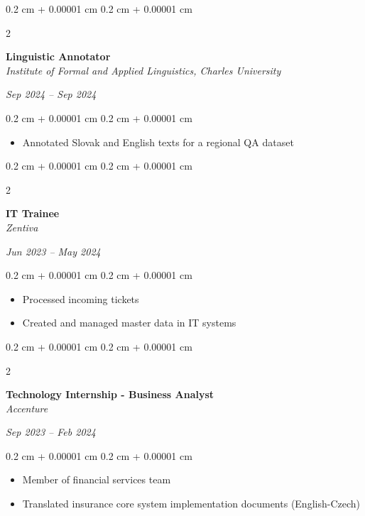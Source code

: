 \documentclass[10pt, letterpaper]{article}
\newenvironment{highlights}{
    \begin{itemize}[
        topsep=0.10 cm,
        parsep=0.10 cm,
        partopsep=0pt,
        itemsep=0pt,
        leftmargin=0.4 cm + 10pt
    ]
}{
    \end{itemize}
} %
\newenvironment{onecolentry}{
    \begin{adjustwidth}{
        0.2 cm + 0.00001 cm
    }{
        0.2 cm + 0.00001 cm
    }
}{
    \end{adjustwidth}
} %
\newenvironment{twocolentry}[2][]{
    \onecolentry
    \def\secondColumn{#2}
    \setcolumnwidth{\fill, 4.5 cm}
    \begin{paracol}{2}
}{
    \switchcolumn \raggedleft \secondColumn
    \end{paracol}
    \endonecolentry
} %
\begin{document}
        \vspace{0.2 cm}
        \begin{twocolentry}{\textit{Sep 2024 – Sep 2024}}
            \textbf{Linguistic Annotator}  \\
            \textit{Institute of Formal and Applied Linguistics, Charles University}
        \end{twocolentry}
        
        \vspace{0.10 cm}
        \begin{onecolentry}
            \begin{highlights}
                \item Annotated Slovak and English texts for a regional QA dataset
            \end{highlights}
        \end{onecolentry}
        
        \vspace{0.2 cm}
        \begin{twocolentry}{\textit{Jun 2023 – May 2024}}
            \textbf{IT Trainee}  \\
            \textit{Zentiva}
        \end{twocolentry}
        
        \vspace{0.10 cm}
        \begin{onecolentry}
            \begin{highlights}
                \item Processed incoming tickets
                \item Created and managed master data in IT systems
            \end{highlights}
        \end{onecolentry}
        
        \vspace{0.2 cm}
        \begin{twocolentry}{\textit{Sep 2023 – Feb 2024}}
            \textbf{Technology Internship - Business Analyst}  \\
            \textit{Accenture}
        \end{twocolentry}
        
        \vspace{0.10 cm}
        \begin{onecolentry}
            \begin{highlights}
                \item Member of financial services team
                \item Translated insurance core system implementation documents (English-Czech)
            \end{highlights}
        \end{onecolentry}
        
\end{document}
